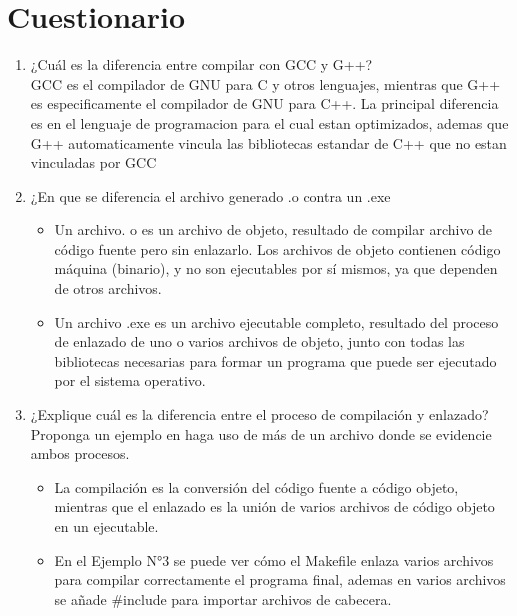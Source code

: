 \documentclass[]{article}
\begin{document}
\section{Cuestionario}
\begin{enumerate}

	\item ¿Cuál es la diferencia entre compilar con GCC y G++? \\
	GCC es el compilador de GNU para C y otros lenguajes, mientras que G++ 
	es especificamente el compilador de GNU para C++. La principal diferencia
	 es en el lenguaje de programacion para el cual estan optimizados, ademas 
	 que G++ automaticamente vincula las bibliotecas estandar de C++ que no 
	 estan vinculadas por GCC

	\item ¿En que se diferencia el archivo generado .o contra un .exe

	\begin{itemize}
		\item Un archivo. o es un archivo de objeto, resultado de compilar 
		archivo de código fuente pero sin enlazarlo. Los archivos de objeto 
		contienen código máquina (binario), y no son ejecutables por sí mismos,
		ya que dependen de otros archivos.
		\item Un archivo .exe es un archivo ejecutable completo, resultado del 
		proceso  de enlazado de uno o varios archivos de objeto, junto con todas
		las bibliotecas necesarias para formar un programa que puede ser 
		ejecutado por el sistema operativo.
	\end{itemize}

	\item ¿Explique cuál es la diferencia entre el proceso de compilación y 
	enlazado? Proponga un ejemplo en haga uso de más de un archivo donde se 
	evidencie ambos procesos.
	\begin{itemize}
		\item La compilación es la conversión del código fuente a código objeto, 
		mientras que el enlazado es la unión de varios archivos de código objeto
		en un ejecutable.
		\item En el Ejemplo N°3 se puede ver cómo el Makefile enlaza varios 
		archivos para compilar correctamente el programa final, ademas en
		varios archivos se añade \#include para importar archivos de
		cabecera.
	\end{itemize}
\end{enumerate}
\end{document}
